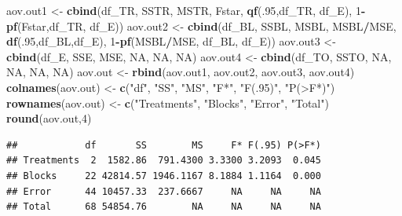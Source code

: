 \documentclass[
]{book}
\newenvironment{Shaded}{\begin{snugshade}}{\end{snugshade}}
\newcommand{\ConstantTok}[1]{\textcolor[rgb]{0.56,0.35,0.01}{#1}}
\newcommand{\DecValTok}[1]{\textcolor[rgb]{0.00,0.00,0.81}{#1}}
\newcommand{\FunctionTok}[1]{\textcolor[rgb]{0.13,0.29,0.53}{\textbf{#1}}}
\newcommand{\NormalTok}[1]{#1}
\newcommand{\OtherTok}[1]{\textcolor[rgb]{0.56,0.35,0.01}{#1}}
\newcommand{\SpecialCharTok}[1]{\textcolor[rgb]{0.81,0.36,0.00}{\textbf{#1}}}
\newcommand{\StringTok}[1]{\textcolor[rgb]{0.31,0.60,0.02}{#1}}
\begin{document}
\begin{Shaded}
\begin{Highlighting}[]
\NormalTok{aov.out1 }\OtherTok{\textless{}{-}} \FunctionTok{cbind}\NormalTok{(df\_TR, SSTR, MSTR, Fstar, }\FunctionTok{qf}\NormalTok{(.}\DecValTok{95}\NormalTok{,df\_TR, df\_E),}
                  \DecValTok{1}\SpecialCharTok{{-}}\FunctionTok{pf}\NormalTok{(Fstar,df\_TR, df\_E))}
\NormalTok{aov.out2 }\OtherTok{\textless{}{-}} \FunctionTok{cbind}\NormalTok{(df\_BL, SSBL, MSBL, MSBL}\SpecialCharTok{/}\NormalTok{MSE, }\FunctionTok{df}\NormalTok{(.}\DecValTok{95}\NormalTok{,df\_BL,df\_E),}
                  \DecValTok{1}\SpecialCharTok{{-}}\FunctionTok{pf}\NormalTok{(MSBL}\SpecialCharTok{/}\NormalTok{MSE, df\_BL, df\_E))}
\NormalTok{aov.out3 }\OtherTok{\textless{}{-}} \FunctionTok{cbind}\NormalTok{(df\_E, SSE, MSE, }\ConstantTok{NA}\NormalTok{, }\ConstantTok{NA}\NormalTok{, }\ConstantTok{NA}\NormalTok{)}
\NormalTok{aov.out4 }\OtherTok{\textless{}{-}} \FunctionTok{cbind}\NormalTok{(df\_TO, SSTO, }\ConstantTok{NA}\NormalTok{, }\ConstantTok{NA}\NormalTok{, }\ConstantTok{NA}\NormalTok{, }\ConstantTok{NA}\NormalTok{)}
\NormalTok{aov.out }\OtherTok{\textless{}{-}} \FunctionTok{rbind}\NormalTok{(aov.out1, aov.out2, aov.out3, aov.out4)}
\FunctionTok{colnames}\NormalTok{(aov.out) }\OtherTok{\textless{}{-}} \FunctionTok{c}\NormalTok{(}\StringTok{"df"}\NormalTok{, }\StringTok{"SS"}\NormalTok{, }\StringTok{"MS"}\NormalTok{, }\StringTok{"F*"}\NormalTok{, }\StringTok{"F(.95)"}\NormalTok{, }\StringTok{"P(\textgreater{}F*)"}\NormalTok{)}
\FunctionTok{rownames}\NormalTok{(aov.out) }\OtherTok{\textless{}{-}} \FunctionTok{c}\NormalTok{(}\StringTok{"Treatments"}\NormalTok{, }\StringTok{"Blocks"}\NormalTok{, }\StringTok{"Error"}\NormalTok{, }\StringTok{"Total"}\NormalTok{)}
\FunctionTok{round}\NormalTok{(aov.out,}\DecValTok{4}\NormalTok{)}
\end{Highlighting}
\end{Shaded}

\begin{verbatim}
##            df       SS        MS     F* F(.95) P(>F*)
## Treatments  2  1582.86  791.4300 3.3300 3.2093  0.045
## Blocks     22 42814.57 1946.1167 8.1884 1.1164  0.000
## Error      44 10457.33  237.6667     NA     NA     NA
## Total      68 54854.76        NA     NA     NA     NA
\end{verbatim}
\end{document}
